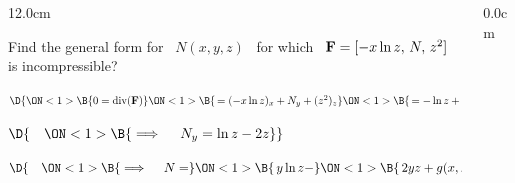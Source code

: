 \begin{frame}
\frametitle{}
\scriptsize
\begin{columns}\begin{column}{12.0cm}

\EX Find the general form for \, $N(x,y,z)$ \, for which \, ${\bf F} = [-x\ln z,\, N,\, z^2]$ \,\, is incompressible?

\vspace{0.2cm}


\vspace{0.2cm}


\vspace{0.2cm}

$\D{
\ON<1>{\B{0 = \text{div}({\bf F})}}
\ON<1>{\B{ \, = (-x\ln z)_x + N_y + (z^2)_z }}
\ON<1>{\B{ \, = -\ln z + N_y + 2z}}}$

\vspace{0.2cm}

$\D{\quad 
\ON<1>{\B{\implies \quad N_y = \ln z - 2z}}}$

\vspace{0.2cm}

$\D{\quad 
\ON<1>{\B{\implies \quad N = }}
\ON<1>{\B{\, y\ln z - }}
\ON<1>{\B{\,2yz + g(x,z)}} \qquad }$ 
 
\vspace{5.8cm}

	
\end{column}\begin{column}{0.0cm}\end{column}\end{columns}
\end{frame}


